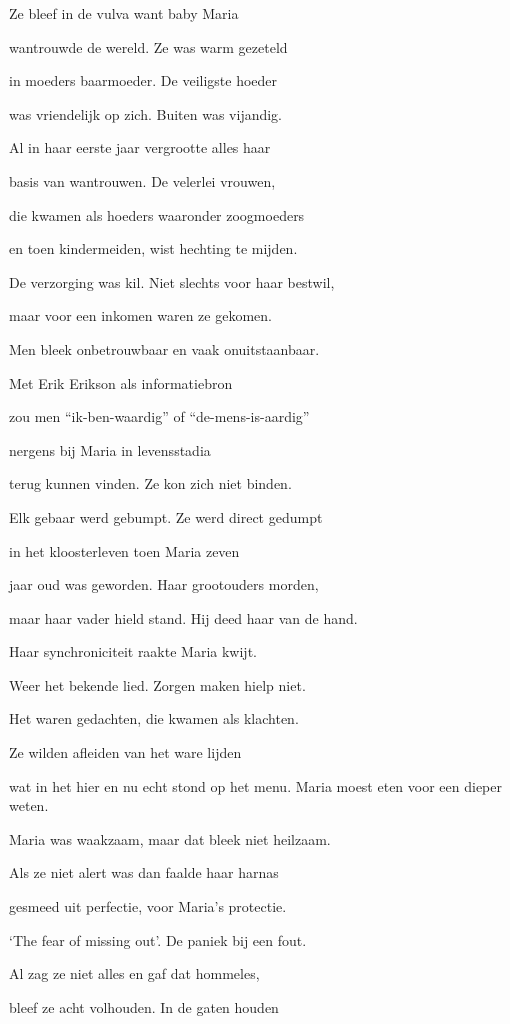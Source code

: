 Ze bleef in de vulva
want baby Maria

wantrouwde de wereld.
Ze was warm gezeteld

in moeders baarmoeder.
De veiligste hoeder

was vriendelijk op zich.
Buiten was vijandig.

Al in haar eerste jaar
vergrootte alles haar

basis van wantrouwen.
De velerlei vrouwen,

die kwamen als hoeders
waaronder zoogmoeders

en toen kindermeiden,
wist hechting te mijden.

De verzorging was kil.
Niet slechts voor haar bestwil,

maar voor een inkomen
waren ze gekomen.

Men bleek onbetrouwbaar
en vaak onuitstaanbaar.

Met Erik Erikson
als informatiebron

zou men “ik-ben-waardig”
of “de-mens-is-aardig”

nergens bij Maria
in levensstadia

terug kunnen vinden.
Ze kon zich niet binden.

Elk gebaar werd gebumpt.
Ze werd direct gedumpt

in het kloosterleven
toen Maria zeven

jaar oud was geworden.
Haar grootouders morden,

maar haar vader hield stand.
Hij deed haar van de hand.

Haar synchroniciteit
raakte Maria kwijt.

Weer het bekende lied.
Zorgen maken hielp niet.

Het waren gedachten,
die kwamen als klachten.

Ze wilden afleiden
van het ware lijden

wat in het hier en nu
echt stond op het menu.
Maria moest eten
voor een dieper weten.

Maria was waakzaam,
maar dat bleek niet heilzaam.

Als ze niet alert was
dan faalde haar harnas

gesmeed uit perfectie,
voor Maria’s protectie.

‘The fear of missing out’.
De paniek bij een fout.

Al zag ze niet alles
en gaf dat hommeles,

bleef ze acht volhouden.
In de gaten houden

